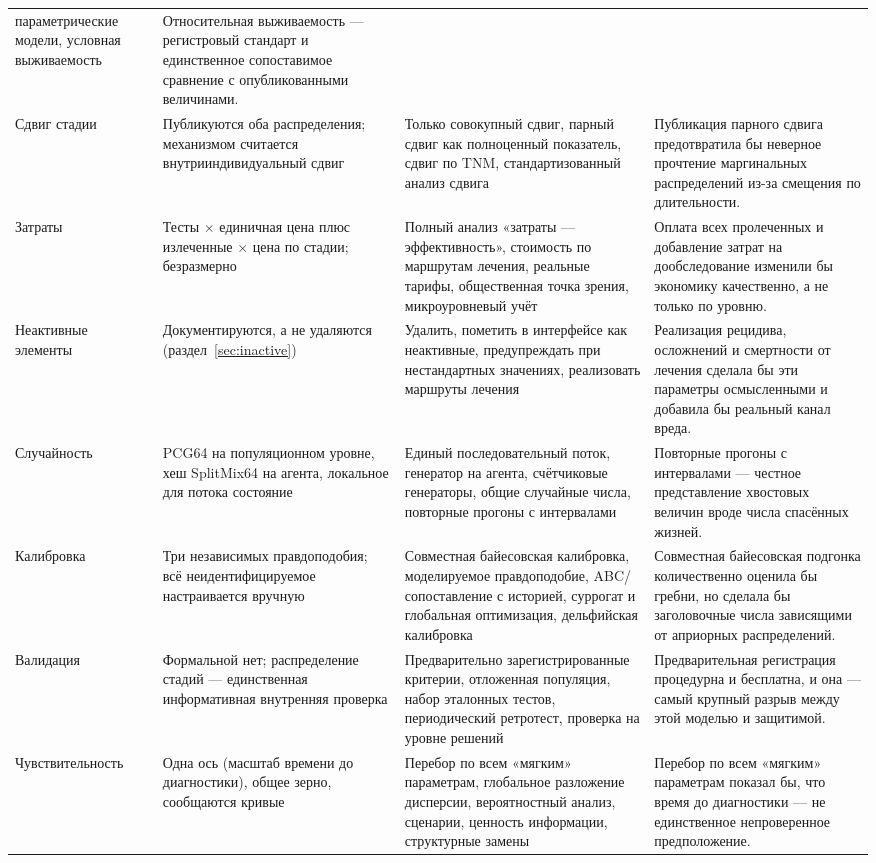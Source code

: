 \documentclass[12pt,a4paper]{article}
\begin{document}
{\begin{longtable}{@{}p{2.3cm}p{4.5cm}p{4.0cm}p{4.0cm}@{}}
параметрические модели, условная выживаемость & Относительная выживаемость --- регистровый стандарт и
единственное сопоставимое сравнение с опубликованными величинами. \\
Сдвиг стадии & Публикуются оба распределения; механизмом считается внутрииндивидуальный сдвиг & Только
совокупный сдвиг, парный сдвиг как полноценный показатель, сдвиг по TNM, стандартизованный анализ сдвига &
Публикация парного сдвига предотвратила бы неверное прочтение маргинальных распределений из-за смещения по
длительности. \\
Затраты & Тесты $\times$ единичная цена плюс излеченные $\times$ цена по стадии; безразмерно & Полный
анализ «затраты --- эффективность», стоимость по маршрутам лечения, реальные тарифы, общественная точка
зрения, микроуровневый учёт & Оплата всех пролеченных и добавление затрат на дообследование изменили бы
экономику качественно, а не только по уровню. \\
Неактивные элементы & Документируются, а не удаляются (раздел~\ref{sec:inactive}) & Удалить, пометить в
интерфейсе как неактивные, предупреждать при нестандартных значениях, реализовать маршруты лечения &
Реализация рецидива, осложнений и смертности от лечения сделала бы эти параметры осмысленными и добавила бы
реальный канал вреда. \\
Случайность & PCG64 на популяционном уровне, хеш SplitMix64 на агента, локальное для потока состояние &
Единый последовательный поток, генератор на агента, счётчиковые генераторы, общие случайные числа, повторные
прогоны с интервалами & Повторные прогоны с интервалами --- честное представление хвостовых величин вроде
числа спасённых жизней. \\
Калибровка & Три независимых правдоподобия; всё неидентифицируемое настраивается вручную & Совместная
байесовская калибровка, моделируемое правдоподобие, ABC/сопоставление с историей, суррогат и глобальная
оптимизация, дельфийская калибровка & Совместная байесовская подгонка количественно оценила бы гребни, но
сделала бы заголовочные числа зависящими от априорных распределений. \\
Валидация & Формальной нет; распределение стадий --- единственная информативная внутренняя проверка &
Предварительно зарегистрированные критерии, отложенная популяция, набор эталонных тестов, периодический
ретротест, проверка на уровне решений & Предварительная регистрация процедурна и бесплатна, и она --- самый
крупный разрыв между этой моделью и защитимой. \\
Чувствительность & Одна ось (масштаб времени до диагностики), общее зерно, сообщаются кривые & Перебор по
всем «мягким» параметрам, глобальное разложение дисперсии, вероятностный анализ, сценарии, ценность
информации, структурные замены & Перебор по всем «мягким» параметрам показал бы, что время до диагностики ---
не единственное непроверенное предположение. \\
\end{longtable}
}
\end{document}
